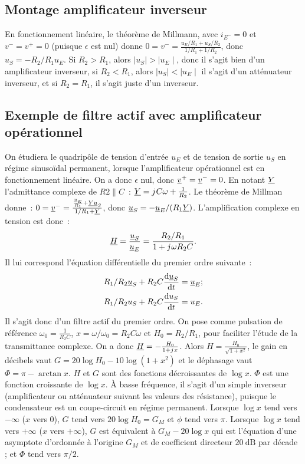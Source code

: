 \subsection{Montage amplificateur inverseur}
En fonctionnement linéaire, le théorème de Millmann, avec \(i_{E^-}=0\) et \(v^-=v^+=0\) (puisque \(\epsilon\) est nul) donne \(0=v^- =\frac{u_E/R_1+u_S/R_2}{1/R_1+1/R_2}\), donc \(u_S = -R_2/R_1 u_E\). Si \(R_2 > R_1\), alors \(\mid u_S \mid > \mid u_E \mid\), donc il s'agit bien d'un amplificateur inverseur, si \(R_2 < R_1\), alors \(\mid u_S \mid < \mid u_E \mid\) il s'agit d'un atténuateur inverseur, et si \(R_2 = R_1\), il s'agit juste d'un inverseur.
\subsection{Exemple de filtre actif avec amplificateur opérationnel}
On étudiera le quadripôle de tension d'entrée \(u_E\) et de tension de sortie \(u_S\) en régime sinusoïdal permanent, lorsque l'amplificateur opérationnel est en fonctionnement linéaire. On a donc \(\epsilon\) nul, donc \(\underline{v}^+=\underline{v}^-=0\). En notant \(\underline{Y}\) l'admittance complexe de \(R2 \parallel C\)~: \(\underline{Y} = {j\mkern1mu} C \omega + \frac{1}{R_2}\). Le théorème de Millman donne~: \(0=\underline{v}^-=\frac{\frac{\underline{u}_E}{R_1}+\underline{Y} \underline{u}_S}{1/R_1+\underline{Y}}\), donc \(\underline{u}_S = -\underline{u}_E/(R_1 \underline{Y})\). L'amplification complexe en tension est donc~:
\begin{equation}
	\underline{H} = \frac{\underline{u}_S}{\underline{u}_E} = \frac{R_2/R_1}{1+{j\mkern1mu}\omega R_2 C}.
\end{equation}
Il lui correspond l'équation différentielle du premier ordre suivante~:
\begin{align}
	R_1/R_2 \underline{u}_S + R_2C \dfrac{\mathrm{d} \underline{u}_S}{\mathrm{d} t} &= \underline{u}_E; \\
	R_1/R_2 u_S + R_2C \dfrac{\mathrm{d} u_S}{\mathrm{d} t} &= u_E.
\end{align}
Il s'agit donc d'un filtre actif du premier ordre. On pose comme pulsation de référence \(\omega_0 = \frac{1}{R_2C}\), \(x = \omega/\omega_0 = R_2C \omega\) et \(H_0 = R_2/R_1\), pour faciliter l'étude de la transmittance complexe. On a donc \(\underline{H} = -\frac{H_0}{1+{j\mkern1mu} x}\). Alors \(H = \frac{H_0}{\sqrt{1+x^2}}\), le gain en décibels vaut \(G = 20\log H_0 - 10 \log(1+x^2)\) et le déphasage vaut \(\Phi = \pi - \arctan x\). \(H\) et \(G\) sont des fonctions décroissantes de \(\log x\). \(\Phi\) est une fonction croissante de \(\log x\). À basse fréquence, il s'agit d'un simple inverseur (amplificateur ou atténuateur suivant les valeurs des résistance), puisque le condensateur est un coupe-circuit en régime permanent. Lorsque \(\log x\) tend vers \(-\infty\) (\(x\) vers 0), \(G\) tend vers \(20\log H_0 = G_M\) et \(\phi\) tend vers \(\pi\). Lorsque \(\log x\) tend vers \(+\infty\) (\(x\) vers \(+\infty\)), \(G\) est équivalent à \(G_M - 20\log x\) qui est l'équation d'une asymptote d'ordonnée à l'origine \(G_M\) et de coefficient directeur \(\SI{20}{\dB}\) par décade ; et \(\Phi\) tend vers \(\pi/2\).

